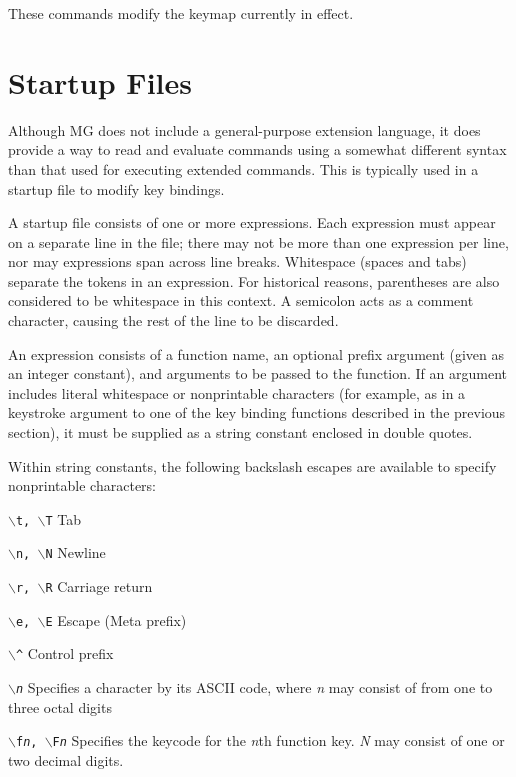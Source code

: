 \fbody These commands modify the keymap currently in effect.


\section{Startup Files}

Although MG does not include a general-purpose extension language, it
does provide a way to read and evaluate commands using a somewhat
different syntax than that used for executing extended commands.  This
is typically used in a startup file to modify key bindings.

A startup file consists of one or more expressions.  Each expression must
appear on a separate line in the file; there may not be more than one
expression per line, nor may expressions span across line breaks.
Whitespace (spaces and tabs) separate the tokens in an expression.  For
historical reasons, parentheses are also considered to be whitespace in
this context.  A semicolon acts as a comment character, causing the rest
of the line to be discarded.

An expression consists of a function name, an optional prefix argument
(given as an integer constant), and arguments to be passed to the
function.  If an argument includes literal whitespace or nonprintable
characters (for example, as in a keystroke argument to one of the key
binding functions described in the previous section), it must be
supplied as a string constant enclosed in double quotes. 

Within string constants, the following backslash escapes are available
to specify nonprintable characters:

\begin{define}{\hspace{1in}}

\item[{\tt $\backslash$t, $\backslash$T}\hfill] Tab 
\item[{\tt $\backslash$n, $\backslash$N}\hfill] Newline 
\item[{\tt $\backslash$r, $\backslash$R}\hfill] Carriage return 
\item[{\tt $\backslash$e, $\backslash$E}\hfill] Escape (Meta prefix) 
\item[{\tt $\backslash$\^{ }}\hfill] Control prefix 

\item[{\tt $\backslash${\em n\/}}\hfill] Specifies a character by its
ASCII code, where {\em n\/} may consist of from one to three octal
digits

\item[{\tt $\backslash$f{\em n\/}, $\backslash$F{\em n\/}}\hfill]
Specifies the keycode for the {\em n\/}th function key.  {\em N\/} may
consist of one or two decimal digits. 

\end{define}

